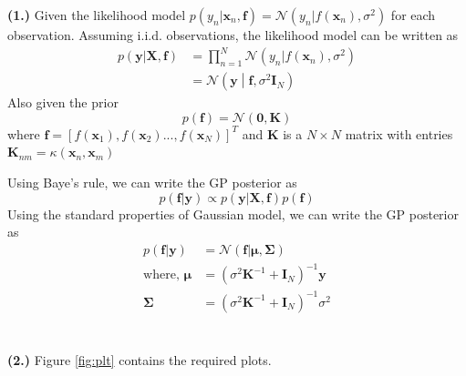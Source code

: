 \documentclass[a4paper,11pt]{article}
\begin{document}
\begin{pmisolution}
\noindent \textbf{(1.) } Given the likelihood model $p(y_n|\textbf{x}_n, \textbf{f}) = \mathcal{N}(y_n|f(\textbf{x}_n), \sigma^2)$ for each observation. Assuming i.i.d. observations, the likelihood model can be written as
\begin{equation*}
    \begin{split}
        p(\textbf{y}|\textbf{X}, \textbf{f}) &= \prod_{n=1}^{N}\mathcal{N}(y_n|f(\textbf{x}_n), \sigma^2) \\
        &= \mathcal{N}\left(\textbf{y}\middle|\textbf{f}, \sigma^2 \textbf{I}_N\right)
    \end{split}
\end{equation*}
Also given the prior
\begin{equation*}
    p(\textbf{f}) = \mathcal{N}(\textbf{0}, \textbf{K})
\end{equation*}
where $\textbf{f} = [f(\textbf{x}_1), f(\textbf{x}_2)...,f(\textbf{x}_N)]^T$ and \textbf{K} is a $N \times N$ matrix with entries $\textbf{K}_{nm} = \kappa(\textbf{x}_n, \textbf{x}_m)$

\noindent Using Baye's rule, we can write the GP posterior as
\begin{equation*}
p(\textbf{f}|\textbf{y}) \propto p(\textbf{y}|\textbf{X}, \textbf{f})p(\textbf{f})    
\end{equation*}
Using the standard properties of Gaussian model, we can write the GP posterior as
\begin{align}
    p(\textbf{f}|\textbf{y}) &= \mathcal{N}(\textbf{f}|\boldsymbol{\mu}, \boldsymbol{\Sigma}) \\
    \nonumber
    \text{where, } \boldsymbol{\mu} &= (\sigma^2\textbf{K}^{-1}+\textbf{I}_N)^{-1}\textbf{y} 
    \nonumber
    \\\boldsymbol{\Sigma}&=(\sigma^2\textbf{K}^{-1}+\textbf{I}_N)^{-1}\sigma^2
    \nonumber
\end{align}
\\ \\
\noindent \textbf{(2.) } Figure \ref{fig:plt} contains the required plots.


\end{pmisolution}
\end{document}
